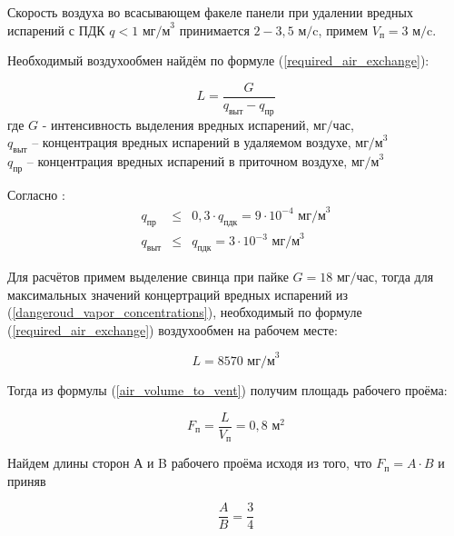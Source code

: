 Скорость воздуха во всасывающем факеле панели при удалении вредных испарений с
ПДК $q < 1$ $\text{мг/м}^3$ \cite[табл. 1.1]{local_vent_spot_calc_method} принимается
$2 - 3,5 \text{ м/c}$, примем $V_\text{п} = 3 \text{ м/c}$.

Необходимый воздухообмен найдём по формуле (\ref{required_air_exchange}):

\begin{equation}
\label{required_air_exchange}
    L = \frac{G}{q_\text{выт} - q_\text{пр}}
\end{equation}
где $G$ - интенсивность выделения вредных испарений, $\text{мг/час}$,                   \\
$q_\text{выт}$ – концентрация вредных испарений в удаляемом воздухе, $\text{мг/м}^3$    \\
$q_\text{пр}$ – концентрация вредных испарений в приточном воздухе, $\text{мг/м}^3$

Согласно \cite[п. 2.15]{ecology_san_norm_245_71}:
\begin{equation}
\label{dangeroud_vapor_concentrations}
    \begin{array}{lcr}
        q_\text{пр}  & \leq & 0,3 \cdot q_\text{пдк} = 9 \cdot 10^{-4} \text{ мг/м}^3 \\
        q_\text{выт} & \leq &           q_\text{пдк} = 3 \cdot 10^{-3} \text{ мг/м}^3
    \end{array}
\end{equation}

Для расчётов примем выделение свинца при пайке $G = 18 \text{ мг/час}$,
тогда для максимальных значений концертраций вредных испарений из
(\ref{dangeroud_vapor_concentrations}), необходимый по формуле (\ref{required_air_exchange})
воздухообмен на рабочем месте:

$$
    L = 8570 \text{ мг/м}^3
$$

Тогда из формулы (\ref{air_volume_to_vent}) получим площадь рабочего проёма:

\begin{equation}
\label{working_window_area}
    F_\text{п} = \frac{L}{V_\text{п}} = 0,8 \text{ м}^2
\end{equation}

Найдем длины сторон А и B рабочего проёма исходя из того, что $F_\text{п}  = A \cdot B$ и приняв

\begin{equation}
\label{working_window_area_sides_ratio}
    \frac{A}{B} = \frac{3}{4}
\end{equation}

